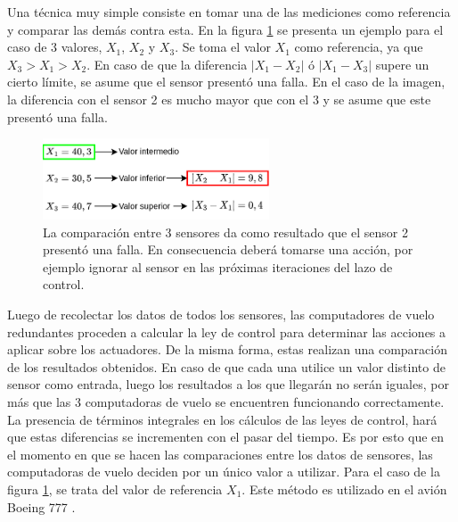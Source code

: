 
Una técnica muy simple consiste en tomar una de las mediciones como referencia y comparar las demás contra esta. En la figura \ref{fig:votacion_sensores} se presenta un ejemplo para el caso de 3 valores, $X_1$, $X_2$ y $X_3$. Se toma el valor $X_1$ como referencia, ya que $X_3 > X_1 > X_2$. En caso de que la diferencia $| X_1 - X_2 |$ ó $| X_1 - X_3 |$ supere un cierto límite, se asume que el sensor presentó una falla. En el caso de la imagen, la diferencia con el sensor 2 es mucho mayor que con el 3 y se asume que este presentó una falla.

\begin{figure}[H]
    \centering
    \includegraphics[width=0.6\textwidth]{img/votacion_sensores.png}
    \caption{La comparación entre 3 sensores da como resultado que el sensor 2 presentó una falla. En consecuencia deberá tomarse una acción, por ejemplo ignorar al sensor en las próximas iteraciones del lazo de control.}
    \label{fig:votacion_sensores}
\end{figure}

Luego de recolectar los datos de todos los sensores, las computadores de vuelo redundantes proceden a calcular la ley de control para determinar las acciones a aplicar sobre los actuadores. De la misma forma, estas realizan una comparación de los resultados obtenidos. En caso de que cada una utilice un valor distinto de sensor como entrada, luego los resultados a los que llegarán no serán iguales, por más que las 3 computadoras de vuelo se encuentren funcionando correctamente. La presencia de términos integrales en los cálculos de las leyes de control, hará que estas diferencias se incrementen con el pasar del tiempo. Es por esto que en el momento en que se hacen las comparaciones entre los datos de sensores, las computadoras de vuelo deciden por un único valor a utilizar. Para el caso de la figura \ref{fig:votacion_sensores}, se trata del valor de referencia $X_1$. Este método es utilizado en el avión Boeing 777 \cite{yeh1996triple}. 

